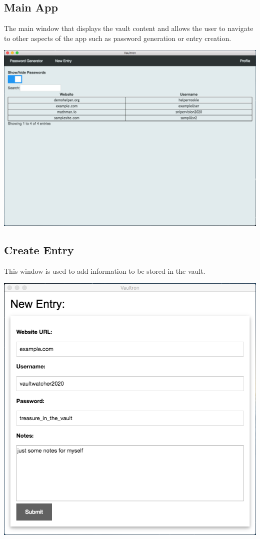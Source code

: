 \documentclass[11pt]{report}
\begin{document}
\subsection{Main App}
The main window that displays the vault content and allows the user to navigate
to other aspects of the app such as password generation or entry creation.

\begin{center}
\includegraphics[scale=0.40]{app-main-demo.png}
\end{center}

\subsection{Create Entry}
This window is used to add information to be stored in the vault.
\begin{center}
\includegraphics[scale=0.40]{app-newentry-demo.png}
\end{center}
\end{document}
